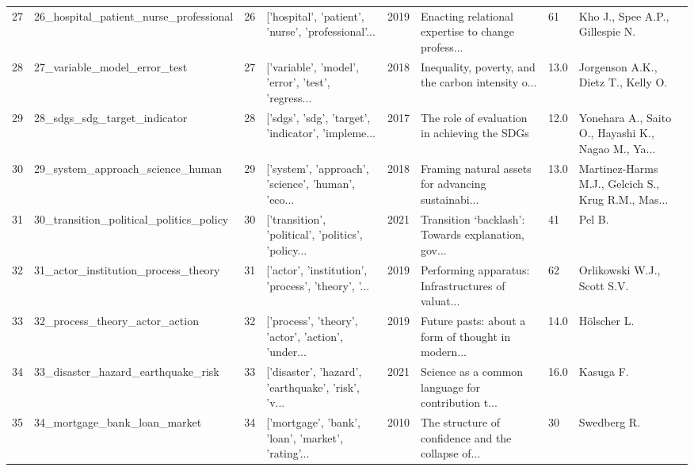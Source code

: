 \begin{tabular}{rlrlrlll}
         27 &             26\_hospital\_patient\_nurse\_professional &        26 & ['hospital', 'patient', 'nurse', 'professional'... &          2019 & Enacting relational expertise to change profess... &      61 &                    Kho J., Spee A.P., Gillespie N. \\
         28 &                       27\_variable\_model\_error\_test &        27 & ['variable', 'model', 'error', 'test', 'regress... &          2018 & Inequality, poverty, and the carbon intensity o... &    13.0 &                 Jorgenson A.K., Dietz T., Kelly O. \\
         29 &                       28\_sdgs\_sdg\_target\_indicator &        28 & ['sdgs', 'sdg', 'target', 'indicator', 'impleme... &          2017 &       The role of evaluation in achieving the SDGs &    12.0 & Yonehara A., Saito O., Hayashi K., Nagao M., Ya... \\
         30 &                   29\_system\_approach\_science\_human &        29 & ['system', 'approach', 'science', 'human', 'eco... &          2018 & Framing natural assets for advancing sustainabi... &    13.0 & Martinez-Harms M.J., Gelcich S., Krug R.M., Mas... \\
         31 &            30\_transition\_political\_politics\_policy &        30 & ['transition', 'political', 'politics', 'policy... &          2021 & Transition ‘backlash’: Towards explanation, gov... &      41 &                                             Pel B. \\
         32 &                31\_actor\_institution\_process\_theory &        31 & ['actor', 'institution', 'process', 'theory', '... &          2019 & Performing apparatus: Infrastructures of valuat... &      62 &                        Orlikowski W.J., Scott S.V. \\
         33 &                     32\_process\_theory\_actor\_action &        32 & ['process', 'theory', 'actor', 'action', 'under... &          2019 & Future pasts: about a form of thought in modern... &    14.0 &                                        Hölscher L. \\
         34 &                 33\_disaster\_hazard\_earthquake\_risk &        33 & ['disaster', 'hazard', 'earthquake', 'risk', 'v... &          2021 & Science as a common language for contribution t... &    16.0 &                                          Kasuga F. \\
         35 &                       34\_mortgage\_bank\_loan\_market &        34 & ['mortgage', 'bank', 'loan', 'market', 'rating'... &          2010 & The structure of confidence and the collapse of... &      30 &                                        Swedberg R. \\

\end{tabular}

